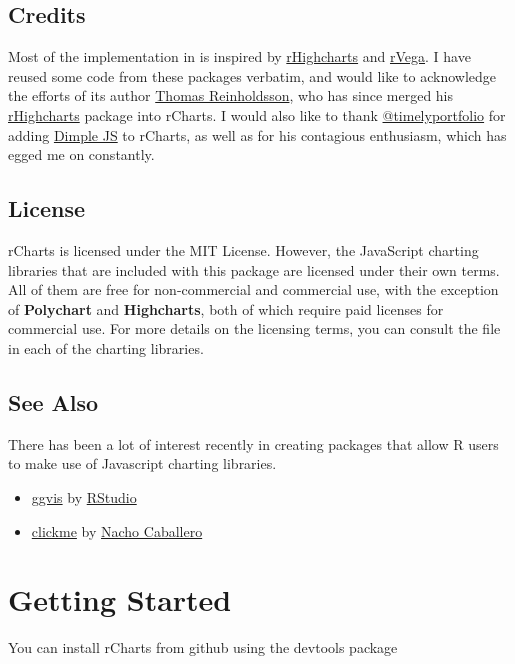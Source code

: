 \documentclass[letterpaper,10pt,english]{sphinxmanual}
\begin{document}
\section{Credits}
\label{quickstart/index:credits}
Most of the implementation in  is inspired by \href{https://github.com/metagraf/rHighcharts}{rHighcharts} and \href{https://github.com/metagraf/rVega}{rVega}. I have reused some code from these packages verbatim, and would like to acknowledge the efforts of its author \href{https://github.com/reinholdsson}{Thomas Reinholdsson}, who has since merged his \href{https://github.com/metagraf/rHighcharts}{rHighcharts} package into rCharts. I would also like to thank \href{https://github.com/timelyportfolio}{@timelyportfolio} for adding \href{http://dimplejs.org}{Dimple JS} to rCharts, as well as for his contagious enthusiasm, which has egged me on constantly.


\section{License}
\label{quickstart/index:license}
rCharts is licensed under the MIT License. However, the JavaScript charting libraries that are included with this package are licensed under their own terms. All of them are free for non-commercial and commercial use, with the exception of \textbf{Polychart} and \textbf{Highcharts}, both of which require paid licenses for commercial use. For more details on the licensing terms, you can consult the  file in each of the charting libraries.


\section{See Also}
\label{quickstart/index:see-also}
There has been a lot of interest recently in creating packages that allow R users to make use of Javascript charting libraries.
\begin{itemize}
\item {} 
\href{http://ggvis.rstudio.com}{ggvis} by \href{http://rstudio.com}{RStudio}

\item {} 
\href{https://github.com/nachocab/clickme}{clickme} by \href{https://github.com/nachocab}{Nacho Caballero}

\end{itemize}


\chapter{Getting Started}
\label{intro/index::doc}\label{intro/index:getting-started}
You can install rCharts from github using the devtools package
\end{document}
